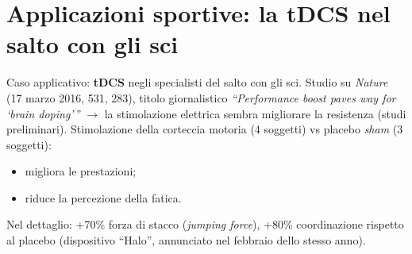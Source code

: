 \section{Applicazioni sportive: la tDCS nel salto con gli sci}

Caso applicativo: \textbf{tDCS} negli specialisti del salto con gli sci. Studio su \textit{Nature}
(17 marzo 2016, 531, 283), titolo giornalistico \textit{``Performance boost paves way for `brain
doping'''} $\rightarrow$ la stimolazione elettrica sembra migliorare la resistenza (studi
preliminari). Stimolazione della corteccia motoria (4 soggetti) vs placebo \textit{sham} (3
soggetti):
\begin{itemize}
  \item migliora le prestazioni;
  \item riduce la percezione della fatica.
\end{itemize}
Nel dettaglio: +70\% forza di stacco (\textit{jumping force}), +80\% coordinazione rispetto al
placebo (dispositivo ``Halo'', annunciato nel febbraio dello stesso anno).
